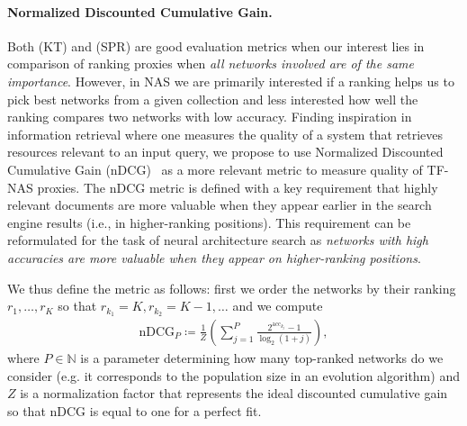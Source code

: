 \paragraph{Normalized Discounted Cumulative Gain.}
Both (KT) and (SPR) are good evaluation metrics when our interest lies in comparison of ranking proxies when \textit{all networks involved are of the same importance}. However, in NAS we are primarily interested if a ranking helps us to pick best networks from a given collection and less interested how well the ranking compares two networks with low accuracy. 
Finding inspiration in information retrieval where one measures the quality of a system that retrieves resources relevant to an input query, we propose to use Normalized Discounted Cumulative Gain (nDCG)~\cite{burges2005learning} as a more relevant metric to measure quality of TF-NAS proxies. The nDCG metric is defined with a key requirement that highly relevant documents are more valuable when they appear earlier in the search engine results (i.e., in higher-ranking positions). This requirement can be reformulated for the task of neural architecture search as \textit{networks with high accuracies are more valuable when they appear on higher-ranking positions}. 

We thus define the metric as follows: first we order the networks by their ranking $r_1,\dots, r_K$ so that $r_{k_1}=K, r_{k_2}=K-1,\dots$ and we compute
\begin{align}
    \text{nDCG}_{P}\coloneq\frac{1}{Z}\left(\sum_{j=1}^P\frac{2^{\text{acc}_{k_j}}-1}{\log_2\left(1+j\right)}\right),
    \label{eq:gain}
\end{align}
where $P\in\mathbb{N}$ is a parameter determining how many top-ranked networks do we consider (e.g. it corresponds to the population size in an evolution algorithm) and $Z$ is a normalization factor that represents the ideal discounted cumulative gain so that nDCG is equal to one for a perfect fit. 

